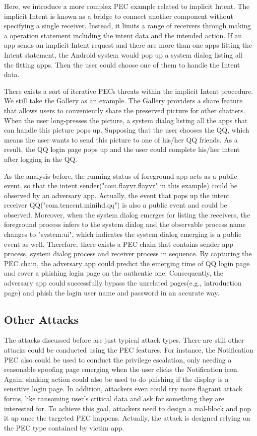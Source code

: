\documentclass{sig-alternate-05-2015}
\begin{document}
Here, we introduce a more complex PEC example related to implicit Intent. The implicit Intent is known as a bridge to connect another component without specifying a single receiver. Instead, it limits a range of receivers through making a operation statement including the intent data and the intended action. If an app sends an implicit Intent request and there are more than one apps fitting the Intent statement, the Android system would pop up a system dialog listing all the fitting apps. Then the user could choose one of them to handle the Intent data.

There exists a sort of iterative PECs threats within the implicit Intent procedure. We still take the Gallery as an example. The Gallery providers a share feature that allows users to conveniently share the preserved picture for other chatters. When the user long-presses the picture, a system dialog listing all the apps that can handle this picture pops up. Supposing that the user chooses the QQ, which means the user wants to send this picture to one of his/her QQ friends. As a result, the QQ login page pops up and the user could complete his/her intent after logging in the QQ.

As the analysis before, the running status of foreground app acts as a public event, so that the intent sender("com.flayvr.flayvr" in this example) could be observed by an adversary app. Actually, the event that pops up the intent receiver QQ("com.tencent.minihd.qq") is also a public event and could be observed. Moreover, when the system dialog emerges for listing the receivers, the foreground process infers to the system dialog and the observable process name changes to "system:ui", which indicates the system dialog emerging is a public event as well. Therefore, there exists a PEC chain that contains sender app process, system dialog process and receiver process in sequence. By capturing the PEC chain, the adversary app could predict the emerging time of QQ login page and cover a phishing login page on the authentic one. Consequently, the adversary app could successfully bypass the unrelated pages(e.g., introduction page) and phish the login user name and password in an accurate way.

\subsection{Other Attacks}
The attacks discussed before are just typical attack types. There are still other attacks could be conducted using the PEC features. For instance, the Notification PEC also could be used to conduct the privilege escalation, only needing a reasonable spoofing page emerging when the user clicks the Notification icon. Again, shaking action could also be used to do phishing if the display is a sensitive login page. In addition, attackers even could try more flagrant attack forms, like ransoming user's critical data and ask for something they are interested for. To achieve this goal, attackers need to design a mal-block and pop it up once the targeted PEC happens. Actually, the attack is designed relying on the PEC type contained by victim app.
\end{document}
